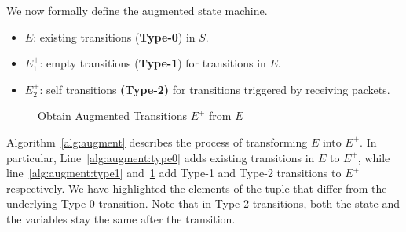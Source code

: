 We now formally define the augmented state machine.

\begin{definition}
  \begin{itemize}
    \item $E$: existing transitions (\textbf{Type-0}) in $S$.
    \item $E^+_1$: empty transitions (\textbf{Type-1}) for transitions in $E$.
    \item $E^+_2$: self transitions \textbf{(Type-2)} for transitions
      triggered by receiving packets.
  \end{itemize}
\end{definition}

\begin{figure}[t!]
\begin{algorithm}[H]
  \caption{Obtain Augmented Transitions $E^+$ from $E$}
  \label{alg:augment}
  \begin{algorithmic}[1]
      \label{alg:augment:type0}
      \label{alg:augment:type1}
        \label{alg:augment:type2}
      \EndIf
    \EndFor
    \State {}
    \EndFunction
  \end{algorithmic}
\end{algorithm}
\end{figure}

Algorithm~\ref{alg:augment} describes the process of transforming $E$ into
$E^+$. In particular, Line~\ref{alg:augment:type0} adds existing transitions in
$E$ to $E^+$, while line~\ref{alg:augment:type1} and~\ref{alg:augment:type2} add
Type-1 and Type-2 transitions to $E^+$ respectively.  We have highlighted the
elements of the tuple that differ from the underlying Type-0 transition. Note
that in Type-2 transitions, both the state and the variables stay the same after
the transition.

